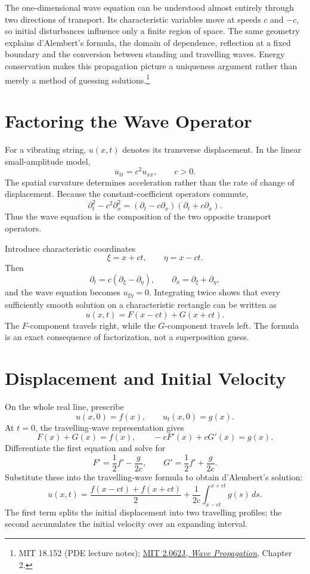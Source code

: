 
The one-dimensional wave equation can be understood almost entirely through two directions of transport. Its characteristic variables move at speeds \(c\) and \(-c\), so initial disturbances influence only a finite region of space. The same geometry explains d'Alembert's formula, the domain of dependence, reflection at a fixed boundary and the conversion between standing and travelling waves. Energy conservation makes this propagation picture a uniqueness argument rather than merely a method of guessing solutions.\footnote{MIT 18.152 (PDE lecture notes); \href{https://ocw.mit.edu/courses/2-062j-wave-propagation-spring-2017/pages/lecture-notes/}{MIT 2.062J, \emph{Wave Propagation}}, Chapter 2.}

\section{Factoring the Wave Operator}

For a vibrating string, \(u(x,t)\) denotes its transverse displacement. In the linear small-amplitude model,
\[
 \boxed{u_{tt}=c^2u_{xx},\qquad c>0.}
\]
The spatial curvature determines acceleration rather than the rate of change of displacement. Because the constant-coefficient operators commute,
\[
 \partial_t^2-c^2\partial_x^2
 =(\partial_t-c\partial_x)(\partial_t+c\partial_x).
\]
Thus the wave equation is the composition of the two opposite transport operators.

Introduce characteristic coordinates
\[
 \xi=x+ct,\qquad\eta=x-ct.
\]
Then
\[
 \partial_t=c(\partial_\xi-\partial_\eta),\qquad
 \partial_x=\partial_\xi+\partial_\eta,
\]
and the wave equation becomes \(u_{\xi\eta}=0\). Integrating twice shows that every sufficiently smooth solution on a characteristic rectangle can be written as
\[
 \boxed{u(x,t)=F(x-ct)+G(x+ct).}
\]
The \(F\)-component travels right, while the \(G\)-component travels left. The formula is an exact consequence of factorization, not a superposition guess.

\section{Displacement and Initial Velocity}

On the whole real line, prescribe
\[
 u(x,0)=f(x),\qquad u_t(x,0)=g(x).
\]
At \(t=0\), the travelling-wave representation gives
\[
 F(x)+G(x)=f(x),\qquad
 -cF'(x)+cG'(x)=g(x).
\]
Differentiate the first equation and solve for
\[
 F'=\frac12f'-\frac{g}{2c},
 \qquad
 G'=\frac12f'+\frac{g}{2c}.
\]
Substitute these into the travelling-wave formula to obtain d'Alembert's solution:
\[
 \boxed{u(x,t)=\frac{f(x-ct)+f(x+ct)}2
     +\frac1{2c}\int_{x-ct}^{x+ct}g(s)\,ds.}
\]
The first term splits the initial displacement into two travelling profiles; the second accumulates the initial velocity over an expanding interval.

